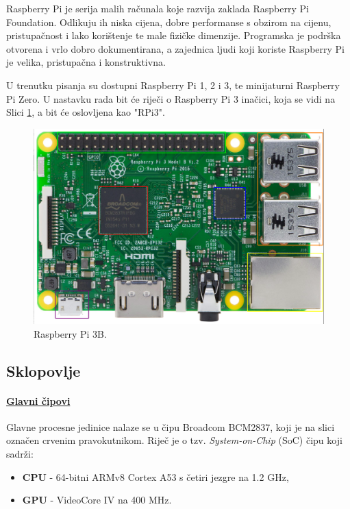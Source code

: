 \documentclass[12pt,a4paper]{article}
\begin{document}
Raspberry Pi je serija malih računala koje razvija zaklada Raspberry Pi Foundation. Odlikuju ih niska cijena, dobre performanse s obzirom na cijenu, pristupačnost i lako korištenje te male fizičke dimenzije. Programska je podrška otvorena i vrlo dobro dokumentirana, a zajednica ljudi koji koriste Raspberry Pi je velika, pristupačna i konstruktivna. \\
\par
U trenutku pisanja su dostupni Raspberry Pi 1, 2 i 3, te minijaturni Raspberry Pi Zero. U nastavku rada bit će riječi o Raspberry Pi 3 inačici, koja se vidi na Slici \ref{fig:rpi3}, a bit će oslovljena kao "RPi3".
\begin{figure}[h!]
  \includegraphics[width=\linewidth]{slike/rpi3_color.png}
  \caption{Raspberry Pi 3B. \cite{rpiwebsite}}
  \label{fig:rpi3}
\end{figure}

	\subsection{Sklopovlje}
		\paragraph{\underline{Glavni čipovi}} %
		\label{par:main_chips}
		
		Glavne procesne jedinice nalaze se u čipu Broadcom BCM2837, koji je na slici označen crvenim pravokutnikom. Riječ je o tzv. \textit{System-on-Chip} (SoC) čipu koji sadrži:
		\begin{itemize}
			\item \textbf{CPU} - 64-bitni ARMv8 Cortex A53 s četiri jezgre na 1.2 GHz,
			\item \textbf{GPU} - VideoCore IV na 400 MHz.
		\end{itemize}
\end{document}
